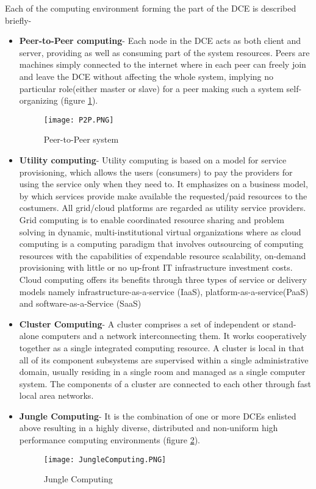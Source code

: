 Each of the computing environment forming the part of the DCE is described briefly-
\begin{itemize}
\item \textbf{Peer-to-Peer computing}- Each node in the DCE acts as both client and server, providing as well as consuming part of the system resources. Peers are machines simply connected to the internet where in each peer can freely join and leave the DCE without affecting the whole system, implying no particular role(either master or slave) for a peer making such a system self-organizing (figure \ref{fig:P2P}).

\begin{figure}[ht!]
\centering
\texttt{[image: P2P.PNG]}
\caption{Peer-to-Peer system}
\label{fig:P2P}
\end{figure}

\item \textbf{Utility computing}- Utility computing is based on a model for service provisioning, which allows the users (consumers) to pay the providers for using the service only when they need to. It emphasizes on a business model, by which services provide make available the requested/paid resources to the costumers. All grid/cloud platforms are regarded as utility service providers. Grid computing is to enable coordinated resource sharing and problem solving in dynamic, multi-institutional virtual organizations where as cloud computing is a computing paradigm that involves outsourcing of computing resources with the capabilities of expendable resource scalability, on-demand provisioning with little or no up-front IT infrastructure investment costs. Cloud computing offers its benefits through
three types of service or delivery models namely infrastructure-as-a-service (IaaS), platform-as-a-service(PaaS) and software-as-a-Service (SaaS) 

\item \textbf{Cluster Computing}- A cluster comprises a set of independent or stand-alone computers and a network interconnecting them. It
works cooperatively together as a single integrated computing resource. A cluster is local in that all of its component subsystems are supervised within a single administrative domain, usually residing in a single room and managed as a single computer system. The components of a cluster are connected to each other through fast local area networks. 

\item \textbf{Jungle Computing}- It is the combination of one or more DCEs enlisted above resulting in a highly diverse, distributed and non-uniform high performance computing environments (figure \ref{fig:JungleComputing}).  

\begin{figure}[ht!]
\centering
\texttt{[image: JungleComputing.PNG]}
\caption{Jungle Computing}
\label{fig:JungleComputing}
\end{figure}

\end{itemize}

